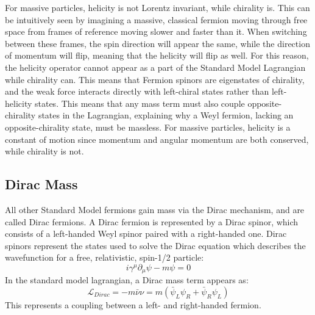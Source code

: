 \documentclass[/main.tex]{subfiles}
\begin{document}
For massive particles, helicity is not Lorentz invariant, while chirality is.
This can be intuitively seen by imagining a massive, classical fermion moving through free space from frames of reference moving slower and faster than it.
When switching between these frames, the spin direction will appear the same, while the direction of momentum will flip, meaning that the helicity will flip as well.
For this reason, the helicity operator cannot appear as a part of the Standard Model Lagrangian while chirality can.
This means that Fermion spinors are eigenstates of chirality, and the weak force interacts directly with left-chiral states rather than left-helicity states.
This means that any mass term must also couple opposite-chirality states in the Lagrangian, explaining why a Weyl fermion, lacking an opposite-chirality state, must be massless.
For massive particles, helicity is a constant of motion since momentum and angular momentum are both conserved, while chirality is not.

\subsection{Dirac Mass} \label{sec:diracmass}
All other Standard Model fermions gain mass via the Dirac mechanism, and are called Dirac fermions\cite{Dirac1928}.
A Dirac fermion is represented by a Dirac spinor, which consists of a left-handed Weyl spinor paired with a right-handed one.
Dirac spinors represent the states used to solve the Dirac equation which describes the wavefunction for a free, relativistic, spin-1/2 particle:
\begin{equation}
  i\gamma^\mu \partial_\mu \psi - m\psi = 0
\end{equation}
In the standard model lagrangian, a Dirac mass term appears as:
\begin{equation}
  \mathcal{L}_{Dirac}=-m\bar\nu\nu=m(\bar\psi_L\psi_R+\bar\psi_R\psi_L)
\end{equation}
This represents a coupling between a left- and right-handed fermion.
\end{document}
